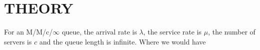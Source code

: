 \documentclass[12pt, a4paper]{article}
\begin{document}
\usetikzlibrary{calc}
    

\section*{THEORY}
For an M/M/c/$\infty$ queue, the arrival rate is $\lambda$, 
the service rate is $\mu$,
 the number of servers is $c$ and the queue length is infinite.
  Where we would have 
\end{document}
